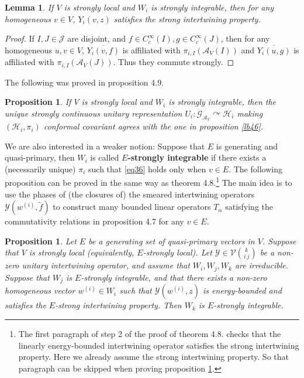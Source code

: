 \documentclass[11pt,b5paper,notitlepage]{article}
\theoremstyle{definition}
\theoremstyle{plain}
\newtheorem{pp}[df]{Proposition}
\newtheorem{lm}[df]{Lemma}
\newcommand{\mc}{\mathcal}
\newcommand{\wtd}{\widetilde}
\newcommand{\ovl}{\overline}
\newcommand{\GAV}{\mathscr G_{\mathcal A_V}}
\numberwithin{equation}{subsection}
\begin{document}
\begin{lm}\label{lb61}
If $V$ is strongly local and $W_i$ is strongly integrable, then for any homogeneous $v\in V$, $Y_i(v,z)$ satisfies the strong intertwining property.
\end{lm}

\begin{proof}
If $I,J\in\mc J$ are disjoint, and $f\in C_c^\infty(I),g\in C_c^\infty(J)$, then for any homogeneous $u,v\in V$, $\ovl{Y_i(v,f)}$ is affiliated with $\pi_{i,I}(\mc A_V(I))$ and $\ovl{Y_i(u,g)}$ is affiliated with $\pi_{i,I}(\mc A_V(J))$. Thus they commute strongly.
\end{proof}

The following was proved in \cite{Gui21a} proposition 4.9.

\begin{pp}
If $V$ is strongly local and $W_i$ is strongly integrable, then the unique strongly continuous unitary representation $U_i:\GAV\curvearrowright\mc H_i$ making $(\mc H_i,\pi_i)$ conformal covariant agrees with the one in proposition \ref{lb46}.
\end{pp}


We are also interested in a weaker notion: Suppose that $E$ is generating and quasi-primary, then $W_i$ is called \textbf{$E$-strongly integrable} if there exists a (necessarily unique) $\pi_i$ such that \eqref{eq36} holds only when $v\in E$. The following proposition can be proved in the same way as \cite{Gui19b} theorem 4.8.\footnote{The first paragraph of step 2 of the proof of \cite{Gui19b} theorem 4.8. checks that the linearly energy-bounded intertwining operator satisfies the strong intertwining property. Here we already assume the strong intertwining property. So that paragraph can be skipped when proving proposition \ref{lb42}.} The main idea is to use the phases of (the closures of) the smeared intertwining operators $\mc Y(w^{(i)},\wtd f)$ to construct many bounded linear operators $T_\alpha$ satisfying the commutativity relations in \cite{Gui19b} proposition 4.7 for any $v\in E$. 

\begin{pp}\label{lb42}
Let $E$ be a generating set of quasi-primary vectors in $V$. Suppose that $V$ is strongly local (equivalently, $E$-strongly local). Let $\mc Y\in\mc V{k\choose i~j}$ be a non-zero unitary intertwining operator, and assume that $W_i,W_j,W_k$ are irreducible. Suppose that $W_j$ is $E$-strongly integrable, and that there exists a non-zero homogeneous vector $w^{(i)}\in W_i$ such that $\mc Y(w^{(i)},z)$ is energy-bounded and satisfies the $E$-strong intertwining property. Then $W_k$ is $E$-strongly integrable.
\end{pp}
\end{document}
